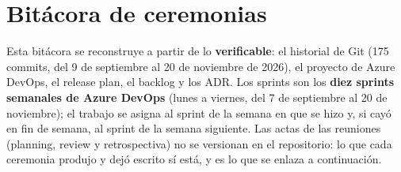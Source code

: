 \chapter{Bitácora de ceremonias}

Esta bitácora se reconstruye a partir de lo \textbf{verificable}: el historial de Git (175 commits, del 9 de septiembre al 20 de noviembre de 2026),
el proyecto de Azure DevOps, el release plan, el backlog y los ADR. Los sprints son los \textbf{diez sprints semanales de Azure DevOps} (lunes a viernes,
del 7 de septiembre al 20 de noviembre); el trabajo se asigna al sprint de la semana en que se hizo y, si cayó en fin de semana, al sprint de la semana
siguiente. Las actas de las reuniones (planning, review y retrospectiva) no se versionan en el repositorio: lo que cada ceremonia produjo y dejó escrito
sí está, y es lo que se enlaza a continuación.

